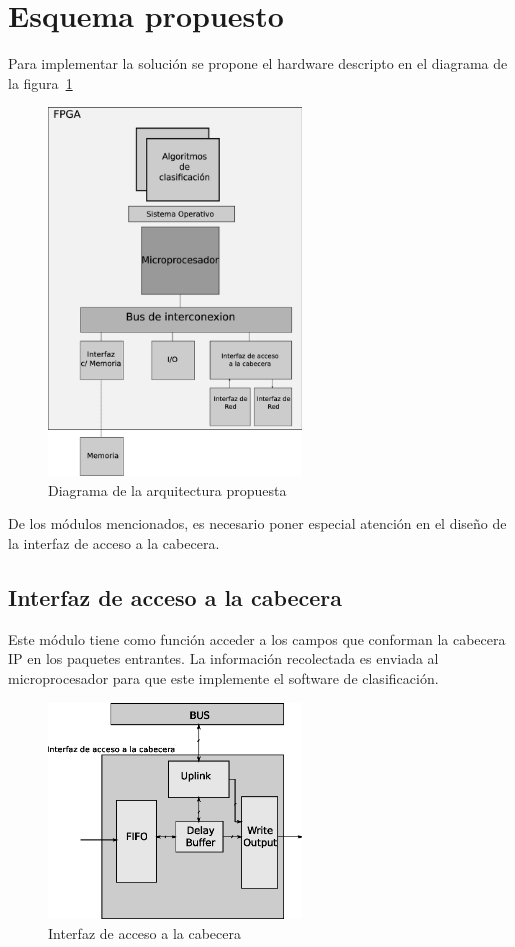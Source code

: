 \section{Esquema propuesto}
Para implementar la solución se propone el hardware descripto en el diagrama de la figura~\ref{fig:solucion}
 \begin{figure}[h]
  \centering
	 \includegraphics[width=0.6\textwidth]{2-sistema/graf/solucion.eps}
  \caption{Diagrama de la arquitectura propuesta}
  \label{fig:solucion}
\end{figure}

De los módulos mencionados, es necesario poner especial atención en el diseño de la interfaz de acceso a la cabecera.

\subsection{Interfaz de acceso a la cabecera}
Este módulo tiene como función acceder a los campos que conforman la cabecera IP en los paquetes entrantes. La información recolectada es enviada al microprocesador para que este implemente el software de clasificación.

\newpage

 \begin{figure}[h]
  \centering
	 \includegraphics[width=0.6\textwidth]{2-sistema/graf/modulo.eps}
  \caption{Interfaz de acceso a la cabecera}
  \label{fig:inter}
\end{figure}



